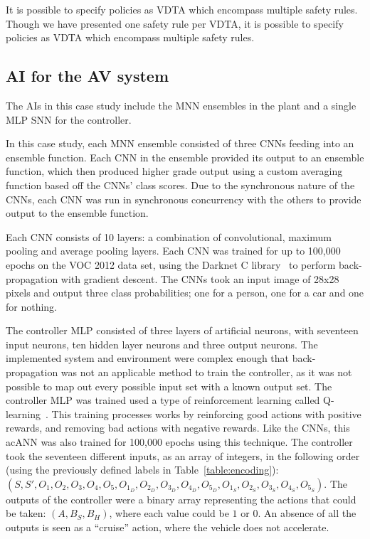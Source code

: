 It is possible to specify policies as \ac{VDTA} which encompass multiple safety rules.
Though we have presented one safety rule per \ac{VDTA}, it is possible to specify policies as \ac{VDTA} which encompass multiple safety rules.

\subsection{\acf{AI} for the \acf{AV} system}

The \acp{AI} in this case study include the \ac{MNN} ensembles in the plant and a single \ac{MLP} \ac{SNN} for the controller.

In this case study, each \ac{MNN} ensemble consisted of three \acp{CNN} feeding into an ensemble function.
Each \ac{CNN} in the ensemble provided its output to an ensemble function, which then produced higher grade output using a custom averaging function based off the \acp{CNN}' class scores.
Due to the synchronous nature of the \acp{CNN}, each \ac{CNN} was run in synchronous concurrency with the others to provide output to the ensemble function.
	
Each \ac{CNN} consists of 10 layers: a combination of convolutional, maximum pooling and average pooling layers.
Each \ac{CNN} was trained for up to 100,000 epochs on the \acf{VOC} 2012 data set, using the Darknet C library~\cite{darknet13} to perform back-propagation with gradient descent.
The \acp{CNN} took an input image of 28x28 pixels and output three class probabilities; one for a person, one for a car and one for nothing.

The controller \ac{MLP} consisted of three layers of artificial neurons, with seventeen input neurons, ten hidden layer neurons and three output neurons.
The implemented system and environment were complex enough that back-propagation was not an applicable method to train the controller, as it was not possible to map out every possible input set with a known output set.
The controller \ac{MLP} was trained used a type of reinforcement learning called Q-learning~\cite{qlearning2010}.
This training processes works by reinforcing good actions with positive rewards, and removing bad actions with negative rewards.
Like the \acp{CNN}, this ac{ANN} was also trained for 100,000 epochs using this technique.
The controller took the seventeen different inputs, as an array of integers, in the following order (using the previously defined labels in Table~\ref{table:encoding}): $(S, S', O_1, O_2, O_3, O_4, O_5, O_{1_D}, O_{2_D}, O_{3_D}, O_{4_D}, O_{5_D}, O_{1_S}, O_{2_S}, O_{3_S}, O_{4_S}, O_{5_S})$.
The outputs of the controller were a binary array representing the actions that could be taken: $(A, B_S, B_H)$, where each value could be $1$ or $0$.
An absence of all the outputs is seen as a ``cruise'' action, where the vehicle does not accelerate.

